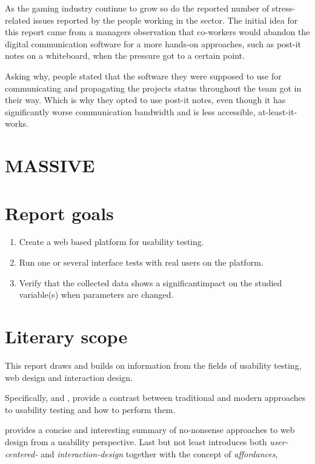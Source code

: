As the gaming industry continue to grow{\findref\findref} so do the reported
number of stress-related issues reported by the people working in the
sector{\findref\findref\findref}. The initial idea for this report came from a managers
observation that co-workers would abandon the digital communication software
for a more hands-on approaches, such as post-it notes on a whiteboard, when
the pressure got to a certain point.

Asking why, people stated that the software they were supposed to use for
communicating and propagating the projects status throughout the team got in
their way. Which is why they opted to use post-it notes, even though it has
significantly worse communication bandwidth and is less accessible,
at-least-it-works\texttrademark.

\section[MASSIVE Entertainment | A Ubisoft studio]{MASSIVE}

{}


\section{Report goals}

  \begin{enumerate}
    \item{Create a web based platform for usability testing.}
    \item{Run one or several interface tests with real users on the platform.}
    \item{
      Verify that the collected data shows a significant\checkTruth impact on the studied
      variable(s) when parameters are changed. 
    }
  \end{enumerate}

\section{Literary scope}

  This report draws and builds on information from the fields of usability
  testing, web design and interaction design.

  Specifically,  and
  , provide a contrast between
  traditional and modern approaches to usability testing and how to perform
  them.

   provides a concise and interesting
  summary of no-nonsense approaches to web design from a usability perspective.
  Last but not least  introduces
  both \textit{user-centered-} and \textit{interaction-design} together
  with the concept of \textit{affordances},

